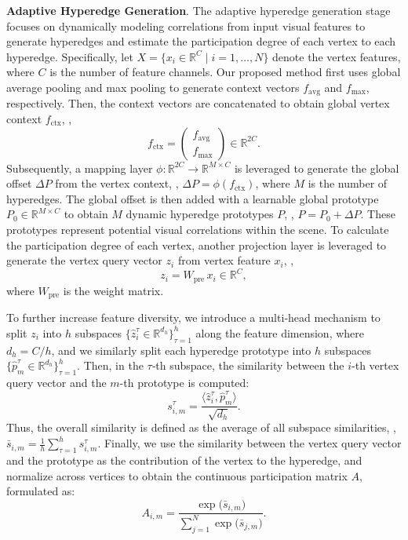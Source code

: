 \textbf{Adaptive Hyperedge Generation}.
The adaptive hyperedge generation stage focuses on dynamically modeling correlations from input visual features to generate hyperedges and estimate the participation degree of each vertex to each hyperedge. Specifically, let $X=\bigl\{x_i \in \mathbb{R}^C \mid i = 1, \dots, N\bigr\}$ denote the vertex features, where $C$ is the number of feature channels. Our proposed method first uses global average pooling and max pooling to generate context vectors $f_{\mathrm{avg}}$ and $f_{\mathrm{max}}$, respectively. Then, the context vectors are concatenated to obtain global vertex context $f_{\mathrm{ctx}}$, \ie, 
\begin{equation}
    f_{\mathrm{ctx}}
= \begin{pmatrix} f_{\mathrm{avg}} \\[4pt] f_{\mathrm{max}} \end{pmatrix}
\in \mathbb{R}^{2C}.
\end{equation}
Subsequently, a mapping layer $\phi: \mathbb{R}^{2C} \to \mathbb{R}^{M \times C}$ is leveraged to generate the global offset $\Delta P$ from the vertex context, \ie, $\Delta P = \phi(f_{\mathrm{ctx}})$, where $M$ is the number of hyperedges. The global offset is then added with a learnable global prototype \(P_0 \in \mathbb{R}^{M \times C}\) to obtain $M$ dynamic hyperedge prototypes $P$, \ie, $P = P_0 + \Delta P$. These prototypes represent potential visual correlations within the scene. To calculate the participation degree of each vertex, another projection layer is leveraged to generate the vertex query vector $z_i$ from vertex feature $x_i$, \ie,
\begin{equation}
    z_i = W_{\mathrm{pre}}\,x_i \in \mathbb{R}^C,
\end{equation}
where \(W_{\mathrm{pre}}\) is the weight matrix. 

To further increase feature diversity, we introduce a multi‐head mechanism to split \(z_i\) into \(h\) subspaces $\{ \hat z_i^\tau \in \mathbb{R}^{d_h}\}_{\tau=1}^h$ along the feature dimension, where $d_h = C/h$, and we similarly split each hyperedge prototype into \(h\) subspaces $\{\hat p_m^\tau \in \mathbb{R}^{d_h}\}_{\tau=1}^h$. Then, in the \(\tau\)‐th subspace, the similarity between the $i$-th vertex query vector and the $m$-th prototype is computed:
\begin{equation}
    s_{i,m}^\tau = \frac{\langle \hat z_i^\tau, \hat p_m^\tau\rangle}{\sqrt{d_h}}.
\end{equation}
Thus, the overall similarity is defined as the average of all subspace similarities, \ie, $\bar s_{i,m} = \frac{1}{h} \sum_{\tau=1}^h s_{i,m}^\tau$.
Finally, we use the similarity between the vertex query vector and the prototype as the contribution of the vertex to the hyperedge, and normalize across vertices to obtain the continuous participation matrix \(A\), formulated as:
\begin{equation}
    A_{i,m}
= \frac{\exp\bigl(\bar s_{i,m}\bigr)}
       {\displaystyle\sum_{j=1}^{N}\exp\bigl(\bar s_{j,m}\bigr)}.
\end{equation}

